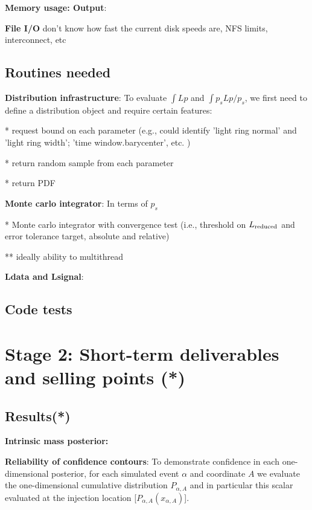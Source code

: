 \documentclass[twocolumn,prd,nofootinbib]{revtex4}
\newcommand\editremark[1]{{\color{red} #1}}
\begin{document}
\noindent \textbf{Memory usage: Output}: 

\noindent \textbf{File I/O} \editremark{don't know} how fast the current disk speeds are, NFS limits, interconnect, etc


\subsection{Routines needed}

\noindent \textbf{Distribution infrastructure}: To evaluate $\int L p$ and $\int p_s L p/p_s$, we first need to define
a distribution object and require certain features:

* request bound on each parameter (e.g., could identify 'light ring normal' and 'light ring width'; 'time
window.barycenter', etc. )

* return random sample from each parameter

* return PDF


\noindent \textbf{Monte carlo integrator}: In terms of $p_s$

* Monte carlo integrator with convergence test (i.e., threshold on $L_{\rm reduced}$ and error tolerance target,
absolute and relative)

** ideally ability to multithread


\noindent \textbf{Ldata and Lsignal}: 



\subsection{Code tests}




\section{Stage 2: Short-term deliverables and selling points (*)} 

\subsection{Results(*)}

\noindent \textbf{Intrinsic mass posterior:}

\noindent \textbf{Reliability of confidence contours}: To demonstrate confidence in each one-dimensional posterior, for
each simulated event $\alpha$ and coordinate $A$ we evaluate the one-dimensional cumulative distribution $P_{\alpha,A}$
and in particular this scalar evaluated at the injection location [$P_{\alpha,A}(x_{\alpha,A})$].  
\end{document}
